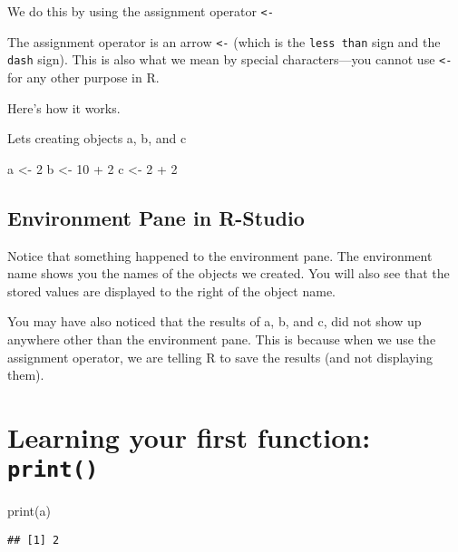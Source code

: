 \documentclass[
]{book}
\newenvironment{Shaded}{\begin{snugshade}}{\end{snugshade}}
\newcommand{\DecValTok}[1]{\textcolor[rgb]{0.00,0.00,0.81}{#1}}
\newcommand{\FunctionTok}[1]{\textcolor[rgb]{0.00,0.00,0.00}{#1}}
\newcommand{\NormalTok}[1]{#1}
\newcommand{\OtherTok}[1]{\textcolor[rgb]{0.56,0.35,0.01}{#1}}
\newcommand{\SpecialCharTok}[1]{\textcolor[rgb]{0.00,0.00,0.00}{#1}}
\begin{document}
We do this by using the assignment operator \texttt{\textless{}-}

The assignment operator is an arrow \texttt{\textless{}-} (which is the \texttt{less\ than} sign and the \texttt{dash} sign). This is also what we mean by special characters---you cannot use \texttt{\textless{}-} for any other purpose in R.

Here's how it works.

Lets creating objects a, b, and c

\begin{Shaded}
\begin{Highlighting}[]
\NormalTok{a }\OtherTok{\textless{}{-}} \DecValTok{2}
\NormalTok{b }\OtherTok{\textless{}{-}} \DecValTok{10} \SpecialCharTok{+} \DecValTok{2}
\NormalTok{c }\OtherTok{\textless{}{-}} \DecValTok{2} \SpecialCharTok{+} \DecValTok{2}
\end{Highlighting}
\end{Shaded}

\hypertarget{environment-pane-in-r-studio}{%
\subsection{Environment Pane in R-Studio}\label{environment-pane-in-r-studio}}

Notice that something happened to the environment pane. The environment name shows you the names of the objects we created. You will also see that the stored values are displayed to the right of the object name.

You may have also noticed that the results of a, b, and c, did not show up anywhere other than the environment pane. This is because when we use the assignment operator, we are telling R to save the results (and not displaying them).

\hypertarget{learning-your-first-function-print}{%
\section{\texorpdfstring{Learning your first function: \texttt{print()}}{Learning your first function: print()}}\label{learning-your-first-function-print}}

\begin{Shaded}
\begin{Highlighting}[]
\FunctionTok{print}\NormalTok{(a)}
\end{Highlighting}
\end{Shaded}

\begin{verbatim}
## [1] 2
\end{verbatim}
\end{document}
